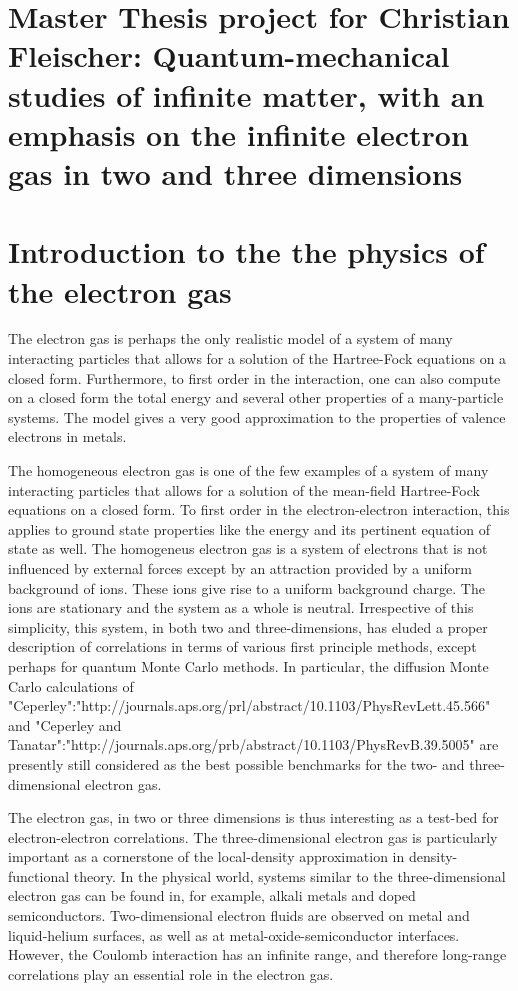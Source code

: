 \documentclass[aps,prc,twocolumn,showpacs,floatfix,nofootinbib,preprintnumbers,superscriptaddress,amsmath,amssymb]{revtex4-1}
\begin{document}
\pagestyle{plain}

\section*{Master Thesis project for Christian Fleischer: Quantum-mechanical studies of infinite matter, with an emphasis on the infinite electron gas in two and three dimensions}

\section*{Introduction to the the physics of the electron gas}
The electron gas is perhaps the only realistic model of a 
system of many interacting particles that allows for a solution
of the Hartree-Fock equations on a closed form. Furthermore, to first order in the interaction, one can also
compute on a closed form the total energy and several other properties of a many-particle systems. 
The model gives a very good approximation to the properties of valence electrons in metals.

The homogeneous electron gas is one of the few examples of a system of many
interacting particles that allows for a solution of the mean-field
Hartree-Fock equations on a closed form.  To first order in the
electron-electron interaction, this applies to ground state properties
like the energy and its pertinent equation of state as well.  The
homogeneus electron gas is a system of electrons that is not
influenced by external forces except by an attraction provided by a
uniform background of ions. These ions give rise to a uniform
background charge.  The ions are stationary and the system as a whole
is neutral.
Irrespective of this simplicity, this system, in both two and
three-dimensions, has eluded a proper description of correlations in
terms of various first principle methods, except perhaps for quantum
Monte Carlo methods. In particular, the diffusion Monte Carlo
calculations of "Ceperley":"http://journals.aps.org/prl/abstract/10.1103/PhysRevLett.45.566" 
and "Ceperley and Tanatar":"http://journals.aps.org/prb/abstract/10.1103/PhysRevB.39.5005" 
are presently still considered as the
best possible benchmarks for the two- and three-dimensional electron
gas. 



The electron gas, in 
two or three dimensions is thus interesting as a test-bed for 
electron-electron correlations. The three-dimensional 
electron gas is particularly important as a cornerstone 
of the local-density approximation in density-functional 
theory. In the physical world, systems 
similar to the three-dimensional electron gas can be 
found in, for example, alkali metals and doped 
semiconductors. Two-dimensional electron fluids are 
observed on metal and liquid-helium surfaces, as well as 
at metal-oxide-semiconductor interfaces. However, the Coulomb 
interaction has an infinite range, and therefore 
long-range correlations play an essential role in the
electron gas. 
\end{document}

